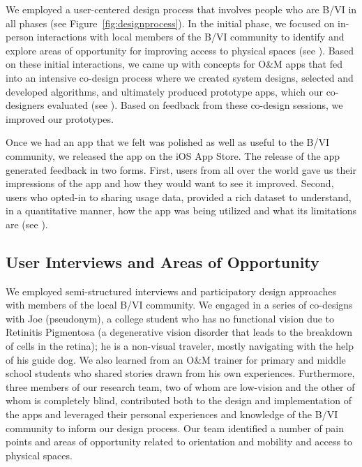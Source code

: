 \documentclass[chi_draft]{sigchi}
\newcommand{\BVI}{B/VI\xspace}
\newcommand{\OM}{O\&M\xspace}
\begin{document}
We employed a user-centered design process that involves people who are \BVI in all phases (see Figure~\ref{fig:designprocess}).  In the initial phase, we focused on in-person interactions with local members of the \BVI community to identify and explore areas of opportunity for improving access to physical spaces (see \emph{}).  Based on these initial interactions, we came up with concepts for \OM apps that fed into an intensive co-design process where we created system designs, selected and developed algorithms, and ultimately produced prototype apps, which our co-designers evaluated (see \emph{}).  Based on feedback from these co-design sessions, we improved our prototypes.

Once we had an app that we felt was polished as well as useful to the \BVI community, we released the app on the iOS App Store.  The release of the app generated feedback in two forms.  First, users from all over the world gave us their impressions of the app and how they would want to see it improved.  Second, users who opted-in to sharing usage data, provided a rich dataset to understand, in a quantitative manner, how the app was being utilized and what its limitations are (see \emph{}).

\subsection{User Interviews and Areas of Opportunity}\label{sec:areasofopportunity}
We employed semi-structured interviews and participatory design approaches \cite{buhler2001empowered, schuler1993participatory} with members of the local \BVI community.  We engaged in a series of co-designs with  Joe (pseudonym), a college student who has no functional vision due to Retinitis Pigmentosa (a degenerative vision disorder that leads to the breakdown of cells in the retina); he is a non-visual traveler, mostly navigating with the help of his guide dog. We also learned from an \OM trainer for primary and middle school students who shared stories drawn from his own experiences. Furthermore, three members of our research team, two of whom are low-vision and the other of whom is completely blind, contributed both to the design and implementation of the apps and leveraged their personal experiences and knowledge of the \BVI community to inform our design process. Our team identified a number of pain points and areas of opportunity related to orientation and mobility and access to physical spaces.
\end{document}
